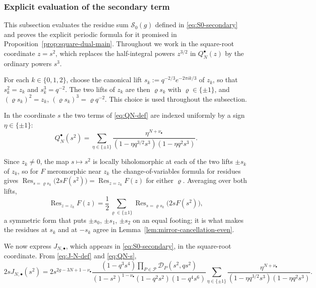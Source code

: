 \documentclass[a4paper,reqno]{amsart}
\numberwithin{equation}{section}
\theoremstyle{remark}
\theoremstyle{definition}
\begin{document}
\subsubsection{Explicit evaluation of the secondary term}

This subsection evaluates the residue sum $\mathcal S_0(g)$ defined in
\eqref{eq:S0-secondary} and proves the explicit periodic formula for it
promised in Proposition~\ref{prop:square-dual-main}. Throughout we work in
the square-root coordinate
$z=s^2$,
which replaces the half-integral powers $z^{3/2}$ in $Q_N^{\bullet}(z)$ by
the ordinary powers $s^3$.

For each $k\in\{0,1,2\}$, choose the canonical lift
$s_k:=q^{-2/3}e^{-2\pi i k/3}$ of $z_k$, so that $s_k^2=z_k$ and
$s_k^3=q^{-2}$. The two lifts of $z_k$ are then $\varrho s_k$ with
$\varrho\in\{\pm1\}$, and $(\varrho s_k)^2=z_k$,
$(\varrho s_k)^3=\varrho q^{-2}$. This choice is used throughout the
subsection.

In the coordinate $s$ the two terms of \eqref{eq:QN-def} are indexed
uniformly by a sign $\eta\in\{\pm1\}$:
\begin{equation}\label{eq:QN-s}
Q_N^{\bullet}(s^2)=\sum_{\eta\in\{\pm1\}}
\frac{\eta^{N+\nu_\bullet}}{(1-\eta q^{3/2}s^3)(1-\eta q^2s^3)}.
\end{equation}

Since $z_k\ne0$, the map $s\mapsto s^2$ is locally biholomorphic at each of
the two lifts $\pm s_k$ of $z_k$, so for $F$ meromorphic near $z_k$ the change-of-variables formula for
residues gives
$\operatorname{Res}_{s=\varrho s_k}\bigl(2sF(s^2)\bigr)=\operatorname{Res}_{z=z_k}F(z)$
for either $\varrho$. Averaging over both lifts,
\begin{equation}\label{eq:residue-lift}
\operatorname{Res}_{z=z_k}F(z)
=\frac12\sum_{\varrho\in\{\pm1\}}
\operatorname{Res}_{s=\varrho s_k}\bigl(2sF(s^2)\bigr),
\end{equation}
a symmetric form that puts $\pm s_0$, $\pm s_1$, $\pm s_2$ on an equal
footing; it is what makes the residues at $s_k$ and at $-s_k$ agree in
Lemma~\ref{lem:mirror-cancellation-even}.

We now express $J_{N,\bullet}$, which appears in \eqref{eq:S0-secondary}, in
the square-root coordinate. From \eqref{eq:J-N-def} and \eqref{eq:QN-s},
\begin{equation}\label{eq:J-lifted}
2sJ_{N,\bullet}(s^2)
=
2s^{2g-3N+1-\nu_\bullet}
\frac{(1-q^3s^4)\prod_{P\in\mathcal P}\mathcal D_P(s^2,qs^2)}
{(1-s^2)^{1-\nu_\bullet}(1-q^2s^2)(1-q^4s^6)}
\sum_{\eta\in\{\pm1\}}
\frac{\eta^{N+\nu_\bullet}}
{(1-\eta q^{3/2}s^3)(1-\eta q^2s^3)}.
\end{equation}
\end{document}
